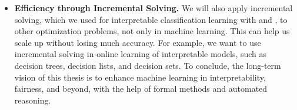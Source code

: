 \begin{itemize}
	\item \textbf{Efficiency through Incremental Solving.} We will also apply incremental solving, which we used for interpretable classification learning with {\imli} and {\crr}, to other optimization problems, not only in machine learning. This can help us scale up without losing much accuracy. For example, we want to use incremental solving in online learning of interpretable models, such as decision trees, decision lists, and decision sets. To conclude, the long-term vision of this thesis is to enhance machine learning in interpretability, fairness, and beyond, with the help of formal methods and automated reasoning.
\end{itemize}

 

\begin{comment}
	\begin{itemize}
		\item Fairness repair
		\item Incremental solving
		\item Fairness and interpretability as a service to more complex models.
	\end{itemize}
\end{comment}
